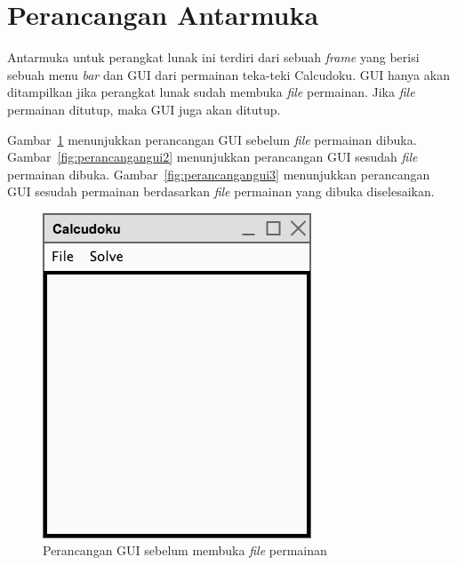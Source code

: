 \section{Perancangan Antarmuka}
\label{sec:perancanganantarmuka}

Antarmuka untuk perangkat lunak ini terdiri dari sebuah \textit{frame} yang berisi sebuah menu \textit{bar} dan GUI dari permainan teka-teki Calcudoku. GUI hanya akan ditampilkan jika perangkat lunak sudah membuka \textit{file} permainan. Jika \textit{file} permainan ditutup, maka GUI juga akan ditutup.

Gambar~\ref{fig:perancangangui1} menunjukkan perancangan GUI sebelum \textit{file} permainan dibuka. Gambar~\ref{fig:perancangangui2} menunjukkan perancangan GUI sesudah \textit{file} permainan dibuka. Gambar~\ref{fig:perancangangui3} menunjukkan perancangan GUI sesudah permainan berdasarkan \textit{file} permainan yang dibuka diselesaikan.

\begin{figure}
\centering
\captionsetup{justification=centering}
\includegraphics[scale=0.5]{Gambar/Perancangan/PerancanganGUI1.png}
\caption[Perancangan GUI sebelum \textit{file} permainan dibuka.]{Perancangan GUI sebelum membuka \textit{file} permainan}
\label{fig:perancangangui1}
\end{figure}

